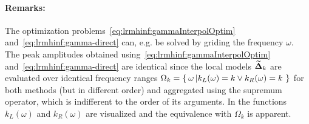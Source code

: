 \paragraph*{Remarks:}
The optimization problems~\eqref{eq:lrmhinf:gammaInterpolOptim} and~\eqref{eq:lrmhinf:gamma-direct} can, e.g. be solved by griding the frequency $\omega$.
The peak amplitudes obtained using~\eqref{eq:lrmhinf:gammaInterpolOptim} and~\eqref{eq:lrmhinf:gamma-direct} are identical since the local models $\widetilde{\mathbf{\Delta}}_k$ are evaluated over identical frequency ranges
$%
  \Omega_k = \Set{\omega \given{k_L(\omega) = k \vee k_R(\omega) = k}}
$ %
for both methods (but in different order) and aggregated using the supremum operator, which is indifferent to the order of its arguments.
In  the functions $k_L(\omega)$ and $k_R(\omega)$ are visualized and the equivalence with $\Omega_k$ is apparent.

